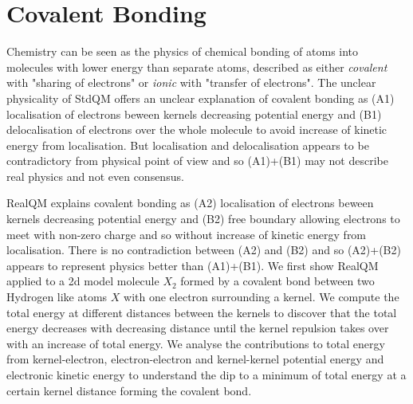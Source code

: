 \documentclass[11pt]{article} %
\begin{document}






\section{Covalent Bonding}

Chemistry can be seen as the physics of chemical bonding of atoms into molecules with lower energy than separate atoms,  described as either \emph{covalent} with "sharing of electrons" or \emph{ionic} with "transfer of electrons". The unclear physicality of StdQM offers an unclear explanation of covalent bonding as (A1) localisation of electrons beween kernels decreasing potential energy and (B1) delocalisation of electrons over the whole molecule to avoid increase of kinetic energy from localisation.  But localisation and delocalisation appears to be contradictory from physical point of view and so (A1)+(B1) may not describe real physics and not even consensus. 

RealQM explains covalent bonding as (A2) localisation of electrons beween kernels decreasing potential energy and (B2) free boundary allowing electrons to meet with non-zero charge and so without increase of kinetic energy from localisation.  There is no contradiction between (A2) and (B2) and so (A2)+(B2) appears to represent physics better than (A1)+(B1).  
We first show RealQM applied to a 2d model molecule $X_2$ formed by a covalent bond between two Hydrogen like atoms $X$ with one electron surrounding a kernel.  We compute the total energy at different distances between the kernels to discover that the total energy decreases with decreasing distance until the kernel repulsion takes over with an increase of total energy.  We analyse the contributions to total energy from kernel-electron,  electron-electron and kernel-kernel potential energy and electronic kinetic energy to understand the dip to a minimum of total energy at a certain kernel distance forming the covalent bond.  
\end{document}

